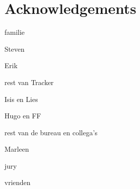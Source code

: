 
\chapter*{Acknowledgements}

familie

Steven

Erik

rest van Tracker

Isis en Lies

Hugo en FF

rest van de bureau en collega's

Marleen

jury

vrienden